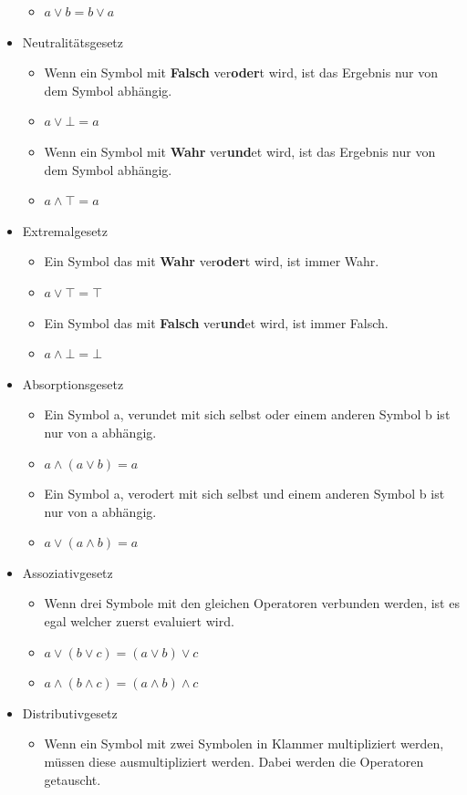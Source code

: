 \documentclass{article}
\begin{document}
\begin{itemize}
\begin{itemize}
				\item{$a\lor b = b \lor a$}
			\end{itemize}
			\item{Neutralitätsgesetz}
			\begin{itemize}
				\item{Wenn ein Symbol mit \textbf{Falsch} ver\textbf{oder}t wird, ist das Ergebnis nur von dem Symbol abhängig.}
				\item{$a\lor\bot =a$}
				\item{Wenn ein Symbol mit \textbf{Wahr} ver\textbf{und}et wird, ist das Ergebnis nur von dem Symbol abhängig.}
				\item{$a\land\top = a$}
			\end{itemize}
			\item{Extremalgesetz}
			\begin{itemize}
				\item{Ein Symbol das mit \textbf{Wahr} ver\textbf{oder}t wird, ist immer Wahr.}
				\item{$a\lor\top =\top$}
				\item{Ein Symbol das mit \textbf{Falsch} ver\textbf{und}et wird, ist immer Falsch.}
				\item{$a\land\bot =\bot$}
			\end{itemize}
			\item{Absorptionsgesetz}
			\begin{itemize}
				\item{Ein Symbol a, verundet mit sich selbst oder einem anderen Symbol b ist nur von a abhängig.}
				\item{$a\land(a\lor b)=a$}
				\item{Ein Symbol a, verodert mit sich selbst und einem anderen Symbol b ist nur von a abhängig.}
				\item{$a\lor(a\land b)=a$}
			\end{itemize}
			\item{Assoziativgesetz}
			\begin{itemize}
				\item{Wenn drei Symbole mit den gleichen Operatoren verbunden werden, ist es egal welcher zuerst evaluiert wird.}
				\item{$a\lor(b\lor c)=(a\lor b)\lor c$}
				\item{$a\land(b\land c)=(a\land b)\land c$}
			\end{itemize}
			\item{Distributivgesetz}
			\begin{itemize}
				\item{Wenn ein Symbol mit zwei Symbolen in Klammer multipliziert werden, müssen diese ausmultipliziert werden. Dabei werden die Operatoren getauscht.}

\end{itemize}
\end{itemize}
\end{document}
